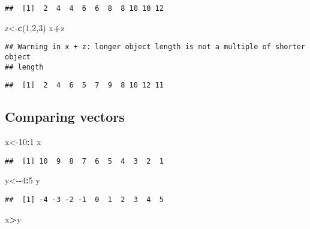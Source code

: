 \documentclass[
]{article}
\newenvironment{Shaded}{\begin{snugshade}}{\end{snugshade}}
\newcommand{\DecValTok}[1]{\textcolor[rgb]{0.00,0.00,0.81}{#1}}
\newcommand{\FunctionTok}[1]{\textcolor[rgb]{0.13,0.29,0.53}{\textbf{#1}}}
\newcommand{\NormalTok}[1]{#1}
\newcommand{\OtherTok}[1]{\textcolor[rgb]{0.56,0.35,0.01}{#1}}
\newcommand{\SpecialCharTok}[1]{\textcolor[rgb]{0.81,0.36,0.00}{\textbf{#1}}}
\begin{document}
\begin{verbatim}
##  [1]  2  4  4  6  6  8  8 10 10 12
\end{verbatim}

\begin{Shaded}
\begin{Highlighting}[]
\NormalTok{z}\OtherTok{\textless{}{-}}\FunctionTok{c}\NormalTok{(}\DecValTok{1}\NormalTok{,}\DecValTok{2}\NormalTok{,}\DecValTok{3}\NormalTok{)}
\NormalTok{x}\SpecialCharTok{+}\NormalTok{z}
\end{Highlighting}
\end{Shaded}

\begin{verbatim}
## Warning in x + z: longer object length is not a multiple of shorter object
## length
\end{verbatim}

\begin{verbatim}
##  [1]  2  4  6  5  7  9  8 10 12 11
\end{verbatim}

\subsection{Comparing vectors}\label{comparing-vectors}

\begin{Shaded}
\begin{Highlighting}[]
\NormalTok{x}\OtherTok{\textless{}{-}}\DecValTok{10}\SpecialCharTok{:}\DecValTok{1}
\NormalTok{x}
\end{Highlighting}
\end{Shaded}

\begin{verbatim}
##  [1] 10  9  8  7  6  5  4  3  2  1
\end{verbatim}

\begin{Shaded}
\begin{Highlighting}[]
\NormalTok{y}\OtherTok{\textless{}{-}}\SpecialCharTok{{-}}\DecValTok{4}\SpecialCharTok{:}\DecValTok{5}
\NormalTok{y}
\end{Highlighting}
\end{Shaded}

\begin{verbatim}
##  [1] -4 -3 -2 -1  0  1  2  3  4  5
\end{verbatim}

\begin{Shaded}
\begin{Highlighting}[]
\NormalTok{x}\SpecialCharTok{\textgreater{}}\NormalTok{y}
\end{Highlighting}
\end{Shaded}
\end{document}
